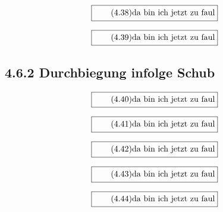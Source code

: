 \documentclass[11pt]{article}
\newcommand{\1}{ {\mathds{1}} }
\begin{document}
    \begin{equation}
      \boxed{
        \tag{4.38}
        \begin{split}
          \text{da bin ich jetzt zu faul}
        \end{split}
      }
    \end{equation}

    \begin{equation}
      \boxed{
        \tag{4.39}
        \begin{split}
          \text{da bin ich jetzt zu faul}
        \end{split}
      }
    \end{equation}
    
    \subsection*{4.6.2 Durchbiegung infolge Schub}

    \begin{equation}
      \boxed{
        \tag{4.40}
        \begin{split}
          \text{da bin ich jetzt zu faul}
        \end{split}
      }
    \end{equation}

    \begin{equation}
      \boxed{
        \tag{4.41}
        \begin{split}
          \text{da bin ich jetzt zu faul}
        \end{split}
      }
    \end{equation}

    \begin{equation}
      \boxed{
        \tag{4.42}
        \begin{split}
          \text{da bin ich jetzt zu faul}
        \end{split}
      }
    \end{equation}

    \begin{equation}
      \boxed{
        \tag{4.43}
        \begin{split}
          \text{da bin ich jetzt zu faul}
        \end{split}
      }
    \end{equation}
    
    \begin{equation}
      \boxed{
        \tag{4.44}
        \begin{split}
          \text{da bin ich jetzt zu faul}
        \end{split}
      }
    \end{equation}
\end{document}

